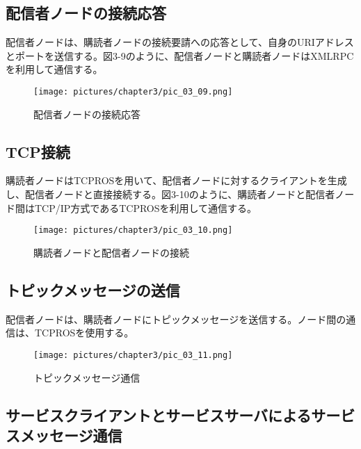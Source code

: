 \subsection{配信者ノードの接続応答}

配信者ノードは、購読者ノードの接続要請への応答として、自身のURIアドレスとポートを送信する。図3-9のように、配信者ノードと購読者ノードはXMLRPCを利用して通信する。

\begin{figure}[h]
  \centering
  \texttt{[image: pictures/chapter3/pic\_03\_09.png]}
  \caption{配信者ノードの接続応答}
\end{figure}

\subsection{TCP接続}

購読者ノードはTCPROSを用いて、配信者ノードに対するクライアントを生成し、配信者ノードと直接接続する。図3-10のように、購読者ノードと配信者ノード間はTCP/IP方式であるTCPROSを利用して通信する。

\begin{figure}[h]
  \centering
  \texttt{[image: pictures/chapter3/pic\_03\_10.png]}
  \caption{購読者ノードと配信者ノードの接続}
\end{figure}

\subsection{トピックメッセージの送信}
配信者ノードは、購読者ノードにトピックメッセージを送信する。ノード間の通信は、TCPROSを使用する。

\begin{figure}[h]
  \centering
  \texttt{[image: pictures/chapter3/pic\_03\_11.png]}
  \caption{トピックメッセージ通信}
\end{figure}

\subsection{サービスクライアントとサービスサーバによるサービスメッセージ通信}

